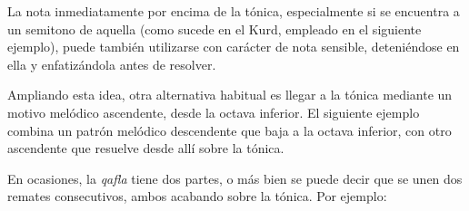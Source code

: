 La nota inmediatamente por encima de la tónica, especialmente si se encuentra a un semitono de aquella (como sucede en el \maqam Kurd, empleado en el siguiente ejemplo), puede también utilizarse con carácter de nota sensible, deteniéndose en ella y enfatizándola antes de resolver.


\begin{center}
\end{center}


Ampliando esta idea, otra alternativa habitual es llegar a la tónica mediante un motivo melódico ascendente, desde la octava inferior. El siguiente ejemplo combina un patrón melódico descendente que baja a la octava inferior, con otro ascendente que resuelve desde allí sobre la tónica.


\begin{center}
\end{center}


En ocasiones, la \emph{qafla} tiene dos partes, o más bien se puede decir que se unen dos remates consecutivos, ambos acabando sobre la tónica. Por ejemplo:


\begin{center}
\end{center}


